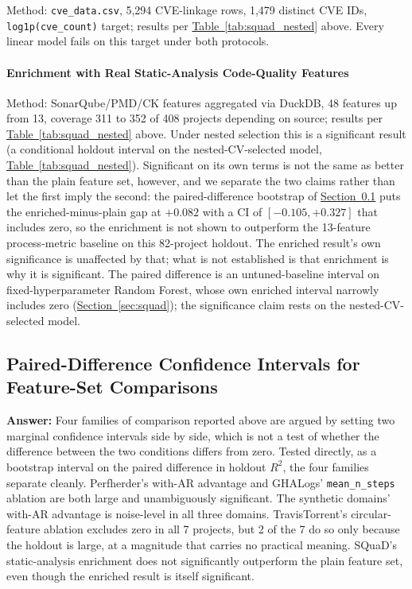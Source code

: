 \documentclass[technologies,article,submit,pdftex,moreauthors]{Definitions/mdpi}
\begin{document}
Method: \texttt{cve\_data.csv}, 5,294 CVE-linkage rows, 1,479 distinct CVE IDs, \texttt{log1p(cve\_count)} target; results per \hyperref[tab:squad_nested]{Table~\ref*{tab:squad_nested}} above. Every linear model fails on this target under both protocols.

\paragraph{Enrichment with Real Static-Analysis Code-Quality Features}\label{sec:squad_enriched}

Method: SonarQube/PMD/CK features aggregated via DuckDB, 48 features up from 13, coverage 311 to 352 of 408 projects depending on source; results per \hyperref[tab:squad_nested]{Table~\ref*{tab:squad_nested}} above. Under nested selection this is a significant result (a conditional holdout interval on the nested-CV-selected model, \hyperref[tab:squad_nested]{Table~\ref*{tab:squad_nested}}). Significant on its own terms is not the same as better than the plain feature set, however, and we separate the two claims rather than let the first imply the second: the paired-difference bootstrap of \hyperref[sec:paired_diff]{Section~\ref*{sec:paired_diff}} puts the enriched-minus-plain gap at \(+0.082\) with a CI of \([-0.105, +0.327]\) that includes zero, so the enrichment is not shown to outperform the 13-feature process-metric baseline on this 82-project holdout. The enriched result's own significance is unaffected by that; what is not established is that enrichment is why it is significant. The paired difference is an untuned-baseline interval on fixed-hyperparameter Random Forest, whose own enriched interval narrowly includes zero (\hyperref[sec:squad]{Section~\ref*{sec:squad}}); the significance claim rests on the nested-CV-selected model.

\subsection{Paired-Difference Confidence Intervals for Feature-Set Comparisons}\label{sec:paired_diff}

\textbf{Answer:} Four families of comparison reported above are argued by setting two marginal confidence intervals side by side, which is not a test of whether the difference between the two conditions differs from zero. Tested directly, as a bootstrap interval on the paired difference in holdout \(R^2\), the four families separate cleanly. Perfherder's with-AR advantage and GHALogs' \texttt{mean\_n\_steps} ablation are both large and unambiguously significant. The synthetic domains' with-AR advantage is noise-level in all three domains. TravisTorrent's circular-feature ablation excludes zero in all 7 projects, but 2 of the 7 do so only because the holdout is large, at a magnitude that carries no practical meaning. SQuaD's static-analysis enrichment does not significantly outperform the plain feature set, even though the enriched result is itself significant.
\end{document}
